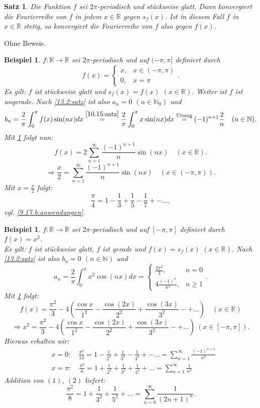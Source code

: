 \documentclass[12pt]{extreport} %
\newcommand{\N}{\mathbb{N}}
\newcommand{\R}{\mathbb{R}}
\theoremstyle{named}
\theoremstyle{itshape}
\newtheorem{satz}[unnamedtheorem]{Satz}
\theoremstyle{normal}
\newtheorem{beispiel}[unnamedtheorem]{Beispiel}
\begin{document}
{\begin{satz} \label{13.3:satz}
	Die Funktion $f$ sei $2\pi$-periodisch und stückweise glatt. Dann konvergiert die Fourierreihe von $f$ in jedem $x \in \R$ gegen $s_{f}(x)$. 
	Ist in diesem Fall $f$ in $x \in \R$ stetig, so konvergiert die Fourierreihe von $f$ also gegen $f(x)$.	
\end{satz}

Ohne Beweis.

\begin{beispiel} \label{13.4:bsp}
	$f \colon \R \rightarrow \R$ sei $2\pi$-periodisch und auf $(-\pi, \pi]$ definiert durch
	$$ f(x) = \begin{cases} x, & x \in (-\pi, \pi) \\ 0, & x = \pi \end{cases}. $$	
	Es gilt: $f$ ist stückweise glatt und $s_{f}(x) = f(x)$ $(x \in \R)$. Weiter ist $f$ ist ungerade. Nach \ref{13.2:satz} ist also $a_{n} = 0$ $(n \in \N_{0})$ und
	$$ b_{n} = \frac{2}{\pi} \int_{0}^{\pi} f(x) \sin(nx) dx \overset{\ref{10.15:satz}}{=} 
	\frac{2}{\pi} \int_{0}^{\pi} x \sin(nx) dx \overset{\text{Übung}}{=} (-1)^{n+1} \frac{2}{n} \quad (n \in \N). $$
	Mit \ref{13.3:satz} folgt nun:
	$$ f(x) = 2 \sum_{n=1}^{\infty} \frac{(-1)^{n+1}}{n} \sin(nx) \quad (x \in \R).$$
	$$ \Rightarrow \frac{x}{2} = \sum_{n=1}^{\infty} \frac{(-1)^{n+1}}{n} \sin(nx) \quad (x \in (-\pi, \pi)). $$
	Mit $x = \frac{\pi}{2}$ folgt: 
	$$\frac{\pi}{4} = 1 - \frac{1}{3} + \frac{1}{5} - \frac{1}{7} +- \dotsc,$$
	vgl. \ref{9.17.b:anwendungen}.
\end{beispiel}


\begin{beispiel} \label{13.5:bsp}
	$f \colon \R \rightarrow \R$ sei $2\pi$-periodisch und auf $[-\pi, \pi]$ definiert durch $f(x) = x^{2}$. \\
	Es gilt: $f$ ist stückweise glatt, $f$ ist gerade und $f(x) = s_{f}(x)$ $(x \in \R)$. Nach \ref{13.2:satz} ist also $b_{n} = 0$ $(n \in \N)$ und
	$$ a_{n} = \frac{2}{\pi} \int_{0}^{\pi} x^{2} \cos(nx) dx = \begin{cases} \frac{2 \pi^{2}}{3}, & n = 0 \\ 4 \frac{ (-1)^{n}}{n^{2}}, & n \ge 1 \end{cases}.  $$
	Mit \ref{13.3:satz} folgt:
	$$ f(x) = \frac{\pi^{2}}{3} - 4 \left( \frac{\cos x}{1^{2}} - \frac{\cos(2x)}{2^{2}} + \frac{\cos(3x)}{3^{2}} -+ \dotsc \right) \quad (x \in \R) $$
	$$\Rightarrow x^{2} = \frac{\pi^{2}}{3} - 4 \left( \frac{\cos x}{1^{2}} - \frac{\cos(2x)}{2^{2}} + \frac{\cos(3x)}{3^{2}} -+ \dotsc \right) ~ (x \in [-\pi, \pi]).$$
	Hieraus erhalten wir:
	\begin{align}
		& x = 0: \quad \frac{\pi^{2}}{12} = 1 - \frac{1}{2^{2}} + \frac{1}{3^{2}} - \frac{1}{4^{2}} +- \dotsc = \sum_{n=1}^{\infty} \frac{(-1)^{n+1}}{n^{2}} \tag{1} \\
		& x = \pi: \quad \frac{\pi^{2}}{6} = 1 + \frac{1}{2^{2}} + \frac{1}{3^{2}} + \frac{1}{4^{2}} + \dotsc = \sum_{n=1}^{\infty} \frac{1}{n^{2}} \tag{2}
	\end{align}
	Addition von $(1)$, $(2)$ liefert: 
	$$\frac{\pi^{2}}{8} = 1 + \frac{1}{3^{2}} + \frac{1}{5^{2}} + \dotsc = \sum_{n=0}^{\infty} \frac{1}{(2n +1)^{n}}.$$
\end{beispiel}


}
\end{document}
